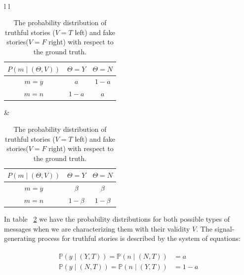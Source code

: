 \begin{table}[t]\
\centering
\captionsetup{justification=centering}
\caption{The probability distribution of truthful stories ($V=T$ left) and fake stories($V=F$ right) with respect to the ground truth.}
\label{tab:Message Type}
\begin{tabular}{ l  l }
\begin{tabular}{| c || c | c |}
\hline
$P(m \mid ( \Theta , V) )$ & $\Theta = Y$ & $\Theta = N$ \\
\hline
\hline
$m=y$                    & $a$          & $1-a$        \\
\hline
$m=n$                    & $1-a$        & $a$         \\
\hline
\end{tabular}
&
\begin{tabular}{| c || c | c |}
\hline
$P(m \mid ( \Theta , V) )$ & $\Theta = Y$ & $\Theta = N$ \\
\hline
\hline
$m=y$                    & $\beta$          & $\beta$        \\
\hline
$m=n$                    & $1-\beta$        & $1-\beta$         \\
\hline
\end{tabular}
\end{tabular}
\end{table}

In table ~\ref{tab:Message Type} we have the probability distributions for both possible types of messages when we are characterizing them with their validity $V$. The signal-generating process for truthful stories is described by the system of equations:

\begin{align}
	\begin{split}
		\mathbb{P} ( y \mid (Y,T)) = \mathbb{P} ( n \mid(N,T)) &=a \\
		\mathbb{P} ( y \mid (N,T)) = \mathbb{P} ( n \mid(Y,T)) &=1-a
	\end{split}
\end{align}


